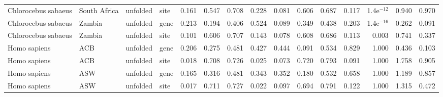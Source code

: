 \begin{longtable}{llllrrrrrrrrrrr}
 Chlorocebus sabaeus &              South Africa &  unfolded &  site &                              0.161 &                               0.547 &                 0.708 &                 0.228 &                              0.081 &                               0.606 &                 0.687 &                 0.117 & 1.4e$^{-12}$ &  0.940 &  0.970 \\
 Chlorocebus sabaeus &                    Zambia &  unfolded &  gene &                              0.213 &                               0.194 &                 0.406 &                 0.524 &                              0.089 &                               0.349 &                 0.438 &                 0.203 & 1.4e$^{-16}$ &  0.262 &  0.091 \\
 Chlorocebus sabaeus &                    Zambia &  unfolded &  site &                              0.101 &                               0.606 &                 0.707 &                 0.143 &                              0.078 &                               0.608 &                 0.686 &                 0.113 &        0.003 &  0.741 &  0.337 \\
        Homo sapiens &                       ACB &  unfolded &  gene &                              0.206 &                               0.275 &                 0.481 &                 0.427 &                              0.444 &                               0.091 &                 0.534 &                 0.829 &        1.000 &  0.436 &  0.103 \\
        Homo sapiens &                       ACB &  unfolded &  site &                              0.018 &                               0.708 &                 0.726 &                 0.025 &                              0.073 &                               0.720 &                 0.793 &                 0.091 &        1.000 &  1.758 &  0.905 \\
        Homo sapiens &                       ASW &  unfolded &  gene &                              0.165 &                               0.316 &                 0.481 &                 0.343 &                              0.352 &                               0.180 &                 0.532 &                 0.658 &        1.000 &  1.189 &  0.857 \\
        Homo sapiens &                       ASW &  unfolded &  site &                              0.017 &                               0.711 &                 0.727 &                 0.022 &                              0.097 &                               0.694 &                 0.791 &                 0.122 &        1.000 &  1.315 &  0.472 \\

\end{longtable}
